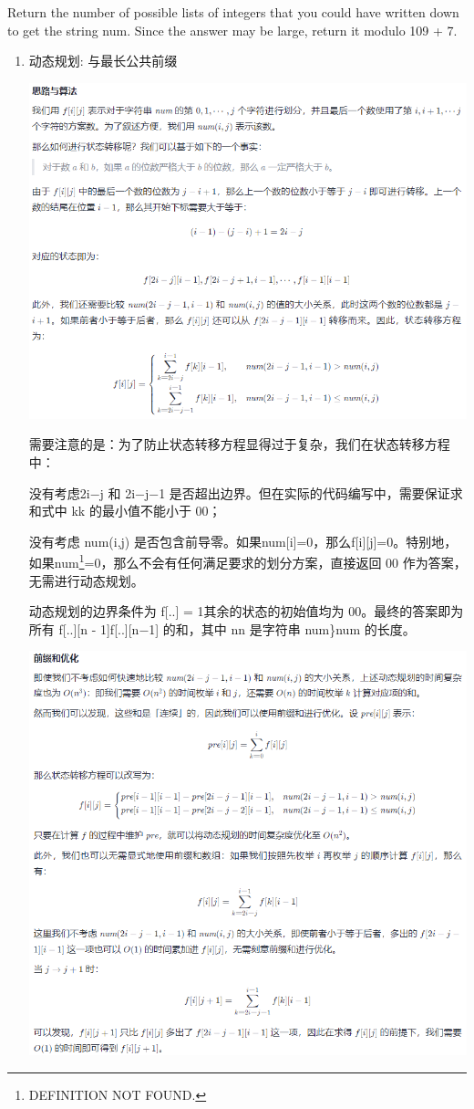 \documentclass[9pt, b5paaper]{book}
\begin{document}
Return the number of possible lists of integers that you could have written down to get the string num. Since the answer may be large, return it modulo 109 + 7.
\begin{enumerate}
\item 动态规划: 与最长公共前缀
\label{sec-1-0-1-1}

\includegraphics[width=.9\linewidth]{./pic/1977-1.png}

需要注意的是：为了防止状态转移方程显得过于复杂，我们在状态转移方程中：

没有考虑2i−j 和 2i−j−1 是否超出边界。但在实际的代码编写中，需要保证求和式中 kk 的最小值不能小于 00；

没有考虑 num(i,j) 是否包含前导零。如果num[i]=0，那么f[i][j]=0。特别地，如果num\footnote{DEFINITION NOT FOUND.}=0，那么不会有任何满足要求的划分方案，直接返回 00 作为答案，无需进行动态规划。

动态规划的边界条件为 f\footnotemark[1]{}[..] = 1其余的状态的初始值均为 00。最终的答案即为所有 f[..][n - 1]f[..][n−1] 的和，其中 nn 是字符串 num\}num 的长度。

\includegraphics[width=.9\linewidth]{./pic/1977-2.png}


\end{enumerate}
\end{document}
